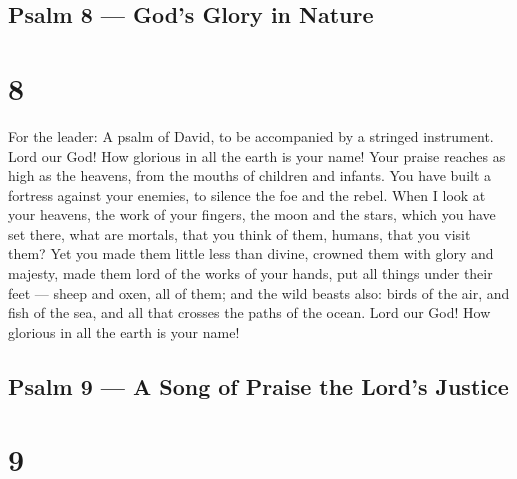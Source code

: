 \hypertarget{psalm-8-gods-glory-in-nature}{%
\subsection{Psalm 8 --- God's Glory in
Nature}\label{psalm-8-gods-glory-in-nature}}

\hypertarget{section-7}{%
\section{8}\label{section-7}}

For the leader: A psalm of David, to be accompanied by a stringed
instrument.  Lord our God! How glorious in all the earth is
your name! Your praise reaches as high as the heavens,  from
the mouths of children and infants. You have built a fortress against
your enemies, to silence the foe and the rebel.  When I look
at your heavens, the work of your fingers, the moon and the stars, which
you have set there,  what are mortals, that you think of
them, humans, that you visit them?  Yet you made them little
less than divine, crowned them with glory and majesty,  made
them lord of the works of your hands, put all things under their feet
---  sheep and oxen, all of them; and the wild beasts also:
 birds of the air, and fish of the sea, and all that crosses
the paths of the ocean.  Lord our God! How glorious in all
the earth is your name!

\hypertarget{psalm-9-a-song-of-praise-the-lords-justice}{%
\subsection{Psalm 9 --- A Song of Praise the Lord's
Justice}\label{psalm-9-a-song-of-praise-the-lords-justice}}

\hypertarget{section-8}{%
\section{9}\label{section-8}}

